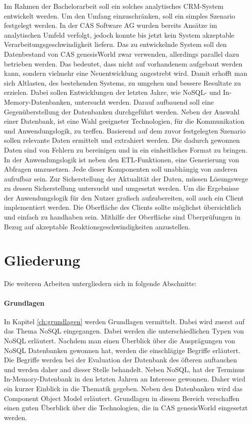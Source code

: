 Im Rahmen der Bachelorarbeit soll ein solches analytisches CRM-System entwickelt werden. Um den Umfang einzuschränken, soll ein simples Szenario festgelegt werden. In der CAS Software AG wurden bereits Ansätze im analytischen Umfeld verfolgt, jedoch konnte bis jetzt kein System akzeptable Verarbeitungsgeschwindigkeit liefern. Das zu entwickelnde System soll den Datenbestand von CAS genesisWorld zwar verwenden, allerdings parallel dazu betrieben werden. Das bedeutet, dass nicht auf vorhandenem aufgebaut werden kann, sondern vielmehr eine Neuentwicklung angestrebt wird. Damit erhofft man sich Altlasten, des bestehenden Systems, zu umgehen und bessere Resultate zu erzielen. Dabei sollen Entwicklungen der letzten Jahre, wie NoSQL- und In-Memory-Datenbanken, untersucht werden. Darauf aufbauend soll eine Gegenüberstellung der Datenbanken durchgeführt werden. Neben der Auswahl einer Datenbank, ist eine Wahl geeigneter Technologien, für die Kommunikation und Anwendungslogik, zu treffen. Basierend auf dem zuvor festgelegten Szenario sollen relevante Daten ermittelt und extrahiert werden. Die dadurch gewonnen Daten sind von Fehlern zu bereinigen und in ein einheitliches Format zu bringen.
In der Anwendungslogik ist neben den ETL-Funktionen, eine Generierung von Abfragen umzusetzen. Jede dieser Komponenten soll unabhängig von anderen aufrufbar sein. Zur Sicherstellung der Aktualität der Daten, müssen Lösungswege zu dessen Sicherstellung untersucht und umgesetzt werden. Um die Ergebnisse der Anwendungslogik für den Nutzer grafisch aufzubereiten, soll auch ein Client implementiert werden. Die Oberfläche des Clients sollte möglichst übersichtlich und einfach zu handhaben sein. Mithilfe der Oberfläche sind Überprüfungen in Bezug auf akzeptable Reaktionsgeschwindigkeiten anzustellen. 

\section{Gliederung}
\label{ch:Einfuehrung:sec:Gliederung}

Die weiteren Arbeiten untergliedern sich in folgende Abschnitte: 
 
\paragraph{Grundlagen} In Kapitel \ref{ch:grundlagen} werden Grundlagen vermittelt. Dabei wird zuerst auf das Thema NoSQL eingegangen. Dabei werden die unterschiedlichen Typen von NoSQL erläutert. Nachdem man einen Überblick über die Ausprägungen von NoSQL Datenbanken gewonnen hat, werden die einschlägige Begriffe erläutert. Die Begriffe werden bei der Evaluation der Datenbank des öfteren auftauchen und werden daher and dieser Stelle behandelt. Neben NoSQL, hat der Terminus In-Memory-Datenbank in den letzten Jahren an Interesse gewonnen. Daher wird ein kurzer Einblick in die Thematik gegeben. Neben den Datenbanken wird das Component Object Model erläutert. Grundlagen in diesem Bereich verschaffen einen guten Überblick über die Technologien, die in CAS genesisWorld eingesetzt werden. 

